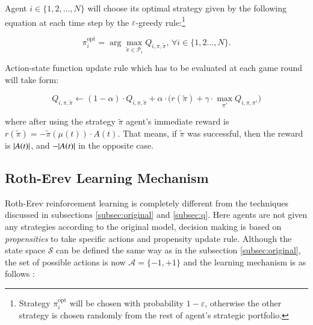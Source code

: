 \documentclass[12pt,american,czech]{article}
\begin{document}
Agent $i\in\{1,2,\dots,N\}$ will choose its optimal strategy given by the following equation at each time step by the $\varepsilon$-greedy rule:\footnote{Strategy $\pi_{i}^{\text{opt}}$ will be chosen with probability $1-\varepsilon$, otherwise the other strategy is chosen randomly from the rest of agent's strategic portfolio.}

\begin{equation}
\pi_{i}^{\text{opt}} = \arg \max_{\tilde{\pi}\in\mathcal{P}_{i}} Q_{i,\pi,\tilde{\pi}},\,\forall i\in\{1,2\dots,N\}.
\end{equation}


Action-state function update rule which has to be evaluated at each game round will take form:

\begin{equation}
Q_{i,\pi,\tilde{\pi}}\leftarrow (1-\alpha)\cdot Q_{i,\pi,\tilde{\pi}}+\alpha\cdot\big(r(\tilde{\pi})+\gamma\cdot\max_{\pi'}Q_{i,\pi,\pi'}\big)
\end{equation}

\noindent
where after using the strategy $\tilde{\pi}$ agent's immediate reward is $r(\tilde{\pi})=-\tilde{\pi}(\mu(t))\cdot A(t)$. That means, if $\tilde{\pi}$ was successful, then the reward is $\arrowvert A(t)\arrowvert$,  and $-\arrowvert A(t)\arrowvert$ in the opposite case.

\subsection{Roth-Erev Learning Mechanism}\label{subsec:rerl}

Roth-Erev reinforcement learning is completely different from the techniques discussed in subsections \ref{subsec:original} and \ref{subsec:q}. Here agents are not given any strategies according to the original model, decision making is based on \textit{propensities} to take specific actions and propensity update rule. Although the state space $\mathcal{S}$ can be defined the same way as in the subsection \ref{subsec:original}, the set of possible actions is now $\mathcal{A}=\{-1,+1\}$ and the learning mechanism is as follows \cite{WHITEHEAD2008}:
\end{document}
